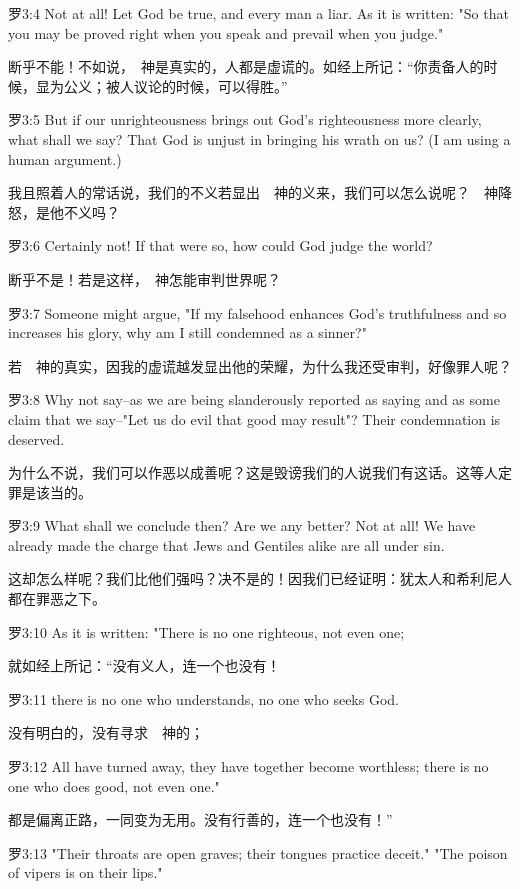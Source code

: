 \documentclass[a4paper,11pt,onecolumn,twoside]{ctexart}
\begin{document}
\begin{multicols}{2}
 罗3:4
 Not at all! Let God be true, and every man a liar. As it is written: "So that you may be proved right when you speak and prevail when you judge."

 断乎不能！不如说，　神是真实的，人都是虚谎的。如经上所记：“你责备人的时候，显为公义；被人议论的时候，可以得胜。”


 罗3:5
 But if our unrighteousness brings out God's righteousness more clearly, what shall we say? That God is unjust in bringing his wrath on us? (I am using a human argument.)

 我且照着人的常话说，我们的不义若显出　神的义来，我们可以怎么说呢？　神降怒，是他不义吗？


 罗3:6
 Certainly not! If that were so, how could God judge the world?

 断乎不是！若是这样，　神怎能审判世界呢？


 罗3:7
 Someone might argue, "If my falsehood enhances God's truthfulness and so increases his glory, why am I still condemned as a sinner?"

 若　神的真实，因我的虚谎越发显出他的荣耀，为什么我还受审判，好像罪人呢？


 罗3:8
 Why not say--as we are being slanderously reported as saying and as some claim that we say--"Let us do evil that good may result"? Their condemnation is deserved.

 为什么不说，我们可以作恶以成善呢？这是毁谤我们的人说我们有这话。这等人定罪是该当的。


 罗3:9
 What shall we conclude then? Are we any better? Not at all! We have already made the charge that Jews and Gentiles alike are all under sin.

 这却怎么样呢？我们比他们强吗？决不是的！因我们已经证明：犹太人和希利尼人都在罪恶之下。


 罗3:10
 As it is written: "There is no one righteous, not even one;

 就如经上所记：“没有义人，连一个也没有！


 罗3:11
 there is no one who understands, no one who seeks God.

 没有明白的，没有寻求　神的；


 罗3:12
 All have turned away, they have together become worthless; there is no one who does good, not even one."

 都是偏离正路，一同变为无用。没有行善的，连一个也没有！”


 罗3:13
 "Their throats are open graves; their tongues practice deceit." "The poison of vipers is on their lips."


\end{multicols}
\end{document}
